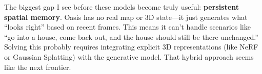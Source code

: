 \documentclass[11pt,a4paper]{article}
\begin{document}
The biggest gap I see before these models become truly useful: \textbf{persistent spatial memory}. Oasis has no real map or 3D state---it just generates what ``looks right'' based on recent frames. This means it can't handle scenarios like ``go into a house, come back out, and the house should still be there unchanged.'' Solving this probably requires integrating explicit 3D representations (like NeRF or Gaussian Splatting) with the generative model. That hybrid approach seems like the next frontier.
\end{document}
